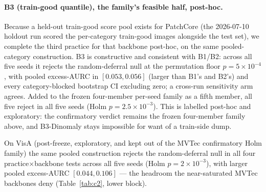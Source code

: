 \documentclass[11pt]{article}
\begin{document}
\paragraph{B3 (train-good quantile), the family's feasible half, post-hoc.} Because a held-out
train-good score pool exists for PatchCore (the 2026-07-10 holdout run scored the per-category
train-good images alongside the test set), we complete the third practice for that backbone
post-hoc, on the same pooled-category construction. B3 is constructive and consistent with B1/B2:
across all five seeds it rejects the random-deferral null at the permutation floor
$p=5\times10^{-4}$, with pooled excess-AURC in $[0.053,0.056]$ (larger than B1's and B2's) and every
category-blocked bootstrap CI excluding zero; a cross-run sensitivity arm agrees. Added to the
frozen four-member per-seed family as a fifth member, all five reject in all five seeds
(Holm $p=2.5\times10^{-3}$). This is labelled post-hoc and exploratory: the confirmatory verdict
remains the frozen four-member family above, and B3-Dinomaly stays impossible for want of a
train-side dump.

On VisA (post-freeze, exploratory, and kept out of the MVTec confirmatory Holm family) the same
pooled construction rejects the random-deferral null in all four practice$\times$backbone tests
across all five seeds (Holm $p=2\times10^{-3}$), with larger pooled excess-AURC $[0.044,0.106]$ ---
the headroom the near-saturated MVTec backbones deny (Table~\ref{tab:c2}, lower block).
\end{document}
